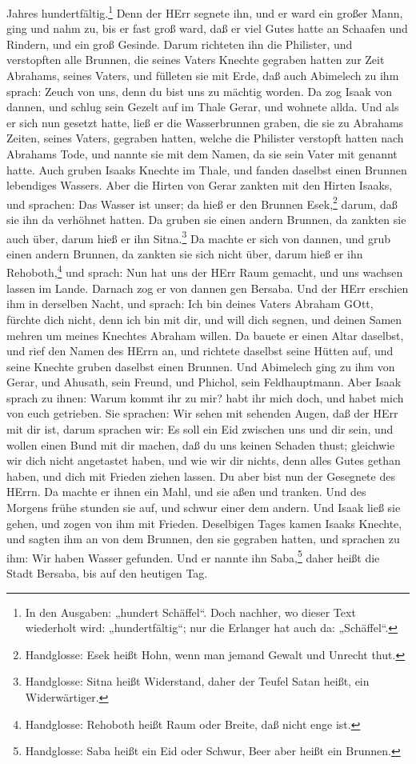 Jahres hundertfältig.\footnote{In den Ausgaben: „hundert Schäffel“. Doch nachher, wo dieser Text wiederholt wird: „hundertfältig“; nur die Erlanger hat auch da: „Schäffel“.} Denn der HErr segnete ihn, und er ward ein großer Mann, ging und nahm zu, bis er fast groß ward, daß er viel Gutes hatte an Schaafen und Rindern, und ein groß Gesinde. Darum richteten ihn die Philister, und verstopften alle Brunnen, die seines Vaters Knechte gegraben hatten zur Zeit Abrahams, seines Vaters, und fülleten sie mit Erde, daß auch Abimelech zu ihm sprach: Zeuch von uns, denn du bist uns zu mächtig worden. Da zog Isaak von dannen, und schlug sein Gezelt auf im Thale Gerar, und wohnete allda. Und als er sich nun gesetzt hatte, ließ er die Wasserbrunnen graben, die sie zu Abrahams Zeiten, seines Vaters, gegraben hatten, welche die Philister verstopft hatten nach Abrahams Tode, und nannte sie mit dem Namen, da sie sein Vater mit genannt hatte. Auch gruben Isaaks Knechte im Thale, und fanden daselbst einen Brunnen lebendiges Wassers. Aber die Hirten von Gerar zankten mit den Hirten Isaaks, und sprachen: Das Wasser ist unser; da hieß er den Brunnen Esek,\footnote{Handglosse: Esek heißt Hohn, wenn man jemand Gewalt und Unrecht thut.} darum, daß sie ihn da verhöhnet hatten. Da gruben sie einen andern Brunnen, da zankten sie auch über, darum hieß er ihn Sitna.\footnote{Handglosse: Sitna heißt Widerstand, daher der Teufel Satan heißt, ein Widerwärtiger.} Da machte er sich von dannen, und grub einen andern Brunnen, da zankten sie sich nicht über, darum hieß er ihn Rehoboth,\footnote{Handglosse: Rehoboth heißt Raum oder Breite, daß nicht enge ist.} und sprach: Nun hat uns der HErr Raum gemacht, und uns wachsen lassen im Lande. Darnach zog er von dannen gen Bersaba. Und der HErr erschien ihm in derselben Nacht, und sprach: Ich bin deines Vaters Abraham GOtt, fürchte dich nicht, denn ich bin mit dir, und will dich segnen, und deinen Samen mehren um meines Knechtes Abraham willen. Da bauete er einen Altar daselbst, und rief den Namen des HErrn an, und richtete daselbst seine Hütten auf, und seine Knechte gruben daselbst einen Brunnen. Und Abimelech ging zu ihm von Gerar, und Ahusath, sein Freund, und Phichol, sein Feldhauptmann. Aber Isaak sprach zu ihnen: Warum kommt ihr zu mir? habt ihr mich doch, und habet mich von euch getrieben. Sie sprachen: Wir sehen mit sehenden Augen, daß der HErr mit dir ist, darum sprachen wir: Es soll ein Eid zwischen uns und dir sein, und wollen einen Bund mit dir machen, daß du uns keinen Schaden thust; gleichwie wir dich nicht angetastet haben, und wie wir dir nichts, denn alles Gutes gethan haben, und dich mit Frieden ziehen lassen. Du aber bist nun der Gesegnete des HErrn. Da machte er ihnen ein Mahl, und sie aßen und tranken. Und des Morgens frühe stunden sie auf, und schwur einer dem andern. Und Isaak ließ sie gehen, und zogen von ihm mit Frieden. Deselbigen Tages kamen Isaaks Knechte, und sagten ihm an von dem Brunnen, den sie gegraben hatten, und sprachen zu ihm: Wir haben Wasser gefunden. Und er nannte ihn Saba,\footnote{Handglosse: Saba heißt ein Eid oder Schwur, Beer aber heißt ein Brunnen.} daher heißt die Stadt Bersaba, bis auf den heutigen Tag.

